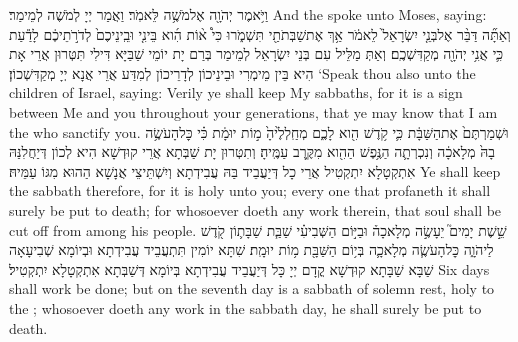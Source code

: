 {וַיֹּ֥אמֶר יְהֹוָ֖ה אֶל\maqqaf מֹשֶׁ֥ה לֵּאמֹֽר׃}
{וַאֲמַר יְיָ לְמֹשֶׁה לְמֵימַר׃}
{And the \lord\space spoke unto Moses, saying:}{}
{וְאַתָּ֞ה דַּבֵּ֨ר אֶל\maqqaf בְּנֵ֤י יִשְׂרָאֵל֙ לֵאמֹ֔ר אַ֥ךְ אֶת\maqqaf שַׁבְּתֹתַ֖י תִּשְׁמֹ֑רוּ כִּי֩ א֨וֹת הִ֜וא בֵּינִ֤י וּבֵֽינֵיכֶם֙ לְדֹרֹ֣תֵיכֶ֔ם לָדַ֕עַת כִּ֛י אֲנִ֥י יְהֹוָ֖ה מְקַדִּשְׁכֶֽם׃}
{וְאַתְּ מַלֵּיל עִם בְּנֵי יִשְׂרָאֵל לְמֵימַר בְּרַם יָת יוֹמֵי שַׁבַּיָּא דִּילִי תִּטְּרוּן אֲרֵי אָת הִיא בֵּין מֵימְרִי וּבֵינֵיכוֹן לְדָרֵיכוֹן לְמִדַּע אֲרֵי אֲנָא יְיָ מְקַדִּשְׁכוֹן׃}
{‘Speak thou also unto the children of Israel, saying: Verily ye shall keep My sabbaths, for it is a sign between Me and you throughout your generations, that ye may know that I am the \lord\space who sanctify you.}{}
{וּשְׁמַרְתֶּם֙ אֶת\maqqaf הַשַּׁבָּ֔ת כִּ֛י קֹ֥דֶשׁ הִ֖וא לָכֶ֑ם מְחַֽלְלֶ֙יהָ֙ מ֣וֹת יוּמָ֔ת כִּ֗י כׇּל\maqqaf הָעֹשֶׂ֥ה בָהּ֙ מְלָאכָ֔ה וְנִכְרְתָ֛ה הַנֶּ֥פֶשׁ הַהִ֖וא מִקֶּ֥רֶב עַמֶּֽיהָ׃}
{וְתִטְּרוּן יָת שַׁבְּתָא אֲרֵי קוּדְשָׁא הִיא לְכוֹן דְּיַחֲלִנַּהּ אִתְקְטָלָא יִתְקְטִיל אֲרֵי כָל דְּיַעֲבֵיד בַּהּ עֲבִידְתָא וְיִשְׁתֵּיצֵי אֲנָשָׁא הַהוּא מִגּוֹ עַמֵּיהּ׃}
{Ye shall keep the sabbath therefore, for it is holy unto you; every one that profaneth it shall surely be put to death; for whosoever doeth any work therein, that soul shall be cut off from among his people.}{}
{שֵׁ֣שֶׁת יָמִים֮ יֵעָשֶׂ֣ה מְלָאכָה֒ וּבַיּ֣וֹם הַשְּׁבִיעִ֗י שַׁבַּ֧ת שַׁבָּת֛וֹן קֹ֖דֶשׁ לַיהֹוָ֑ה כׇּל\maqqaf הָעֹשֶׂ֧ה מְלָאכָ֛ה בְּי֥וֹם הַשַּׁבָּ֖ת מ֥וֹת יוּמָֽת׃}
{שִׁתָּא יוֹמִין תִּתְעֲבֵיד עֲבִידְתָא וּבְיוֹמָא שְׁבִיעָאָה שַׁבָּא שַׁבָּתָא קוּדְשָׁא קֳדָם יְיָ כָּל דְּיַעֲבֵיד עֲבִידְתָא בְּיוֹמָא דְּשַׁבְּתָא אִתְקְטָלָא יִתְקְטִיל׃}
{Six days shall work be done; but on the seventh day is a sabbath of solemn rest, holy to the \lord; whosoever doeth any work in the sabbath day, he shall surely be put to death.}{}
